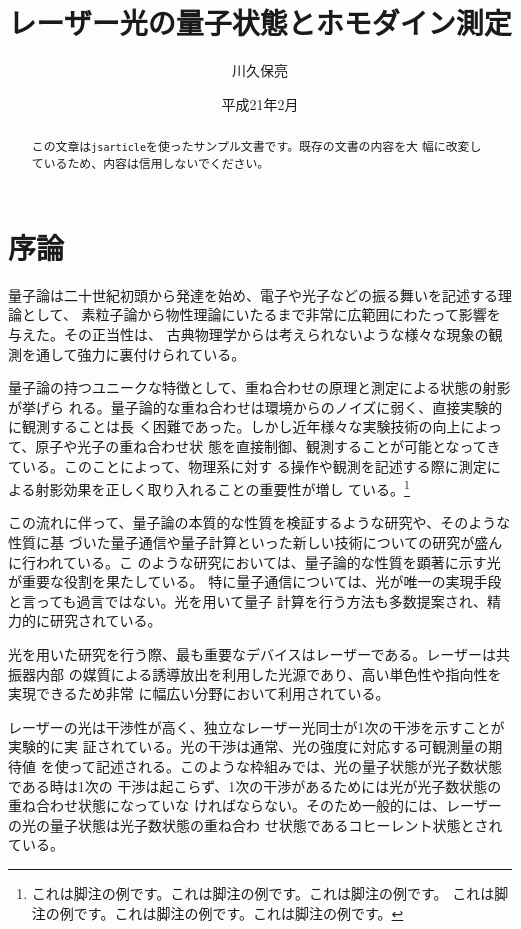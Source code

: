 \documentclass[11pt]{jsarticle}
\title{レーザー光の量子状態とホモダイン測定}
\author{川久保亮}
\date{平成21年2月}
\begin{document}
\maketitle

\begin{abstract}
  この文章は\texttt{jsarticle}を使ったサンプル文書です。既存の文書の内容を大
  幅に改変しているため、内容は信用しないでください。
\end{abstract}

\section{序論}

量子論は二十世紀初頭から発達を始め、電子や光子などの振る舞いを記述する理論として、
素粒子論から物性理論にいたるまで非常に広範囲にわたって影響を与えた。その正当性は、
古典物理学からは考えられないような様々な現象の観測を通して強力に裏付けられている。

量子論の持つユニークな特徴として、重ね合わせの原理と測定による状態の射影が挙げら
れる。量子論的な重ね合わせは環境からのノイズに弱く、直接実験的に観測することは長
く困難であった。しかし近年様々な実験技術の向上によって、原子や光子の重ね合わせ状
態を直接制御、観測することが可能となってきている。このことによって、物理系に対す
る操作や観測を記述する際に測定による射影効果を正しく取り入れることの重要性が増し
ている。\footnote{これは脚注の例です。これは脚注の例です。これは脚注の例です。
これは脚注の例です。これは脚注の例です。これは脚注の例です。}

この流れに伴って、量子論の本質的な性質を検証するような研究や、そのような性質に基
づいた量子通信や量子計算といった新しい技術についての研究が盛んに行われている。こ
のような研究においては、量子論的な性質を顕著に示す光が重要な役割を果たしている。
特に量子通信については、光が唯一の実現手段と言っても過言ではない。光を用いて量子
計算を行う方法も多数提案され、精力的に研究されている。

光を用いた研究を行う際、最も重要なデバイスはレーザーである。レーザーは共振器内部
の媒質による誘導放出を利用した光源であり、高い単色性や指向性を実現できるため非常
に幅広い分野において利用されている。

レーザーの光は干渉性が高く、独立なレーザー光同士が1次の干渉を示すことが実験的に実
証されている\cite{Magyar1963}。光の干渉は通常、光の強度に対応する可観測量の期待値
を使って記述される。このような枠組みでは、光の量子状態が光子数状態である時は1次の
干渉は起こらず、1次の干渉があるためには光が光子数状態の重ね合わせ状態になっていな
ければならない。そのため一般的には、レーザーの光の量子状態は光子数状態の重ね合わ
せ状態であるコヒーレント状態とされている。
\end{document}
